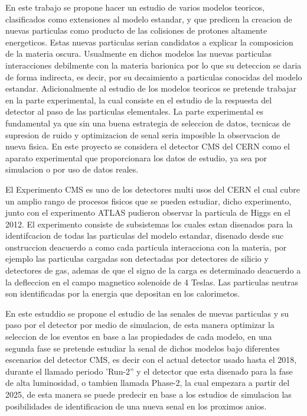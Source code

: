 En este trabajo se propone hacer un estudio de varios modelos teoricos, clasificados como extensiones al modelo estandar, y que predicen la creacion de nuevas particulas como producto de las colisiones de protones altamente energeticos. Estas nuevas particulas serian candidatos a explicar la composicion de la materia oscura.  Usualmente en dichos modelos las nuevas particulas interacciones debilmente con la materia barionica por lo que su deteccion se daria de forma indirecta, es decir, por su decaimiento a particulas conocidas del modelo estandar.  Adicionalmente al estudio de los modelos teoricos se pretende trabajar en la parte experimental, la cual consiste en el estudio de la respuesta del detector al paso de las particulas elementales.  La parte experimental es fundamental ya que sin una buena estrategia de seleccion de datos, tecnicas de supresion de ruido y optimizacion de senal seria imposible la observacion de nueva fisica. En este proyecto se considera el detector CMS del CERN como el aparato experimental que proporcionara los datos de estudio, ya sea por simulacion o por uso de datos reales.  

El Experimento CMS es uno de los detectores multi usos del CERN el cual cubre un amplio rango de procesos fisicos que se pueden estudiar, dicho experimento, junto con el experimento ATLAS pudieron observar la particula de Higgs en el 2012.  El experimento consiste de subsistemas los cuales estan disenados para la identifcacion de todas las particulas del modelo estandar, disenado desde suc onstruccion deacuerdo a como cada particula interacciona con la materia, por ejemplo las particulas cargadas son detectadas por detectores de silicio y detectores de gas, ademas de que el signo de la carga es determinado deacuerdo a la defleccion en el campo magnetico solenoide de 4 Teslas.  Las particulas neutras son identificadas por la energia que depositan en los calorimetos.   

En este estuddio se propone el estudio de las senales de nuevas particulas y su paso por el detector por medio de simulacion, de esta manera optimizar la seleccion de los eventos en base a las propiedades de cada modelo, en una segunda fase se pretende estudiar la senal de dichos modelos bajo diferentes escenarios del detector CMS, es decir con el actual detector usado hasta el 2018, durante el llamado periodo 'Run-2'' y el detector que esta disenado para la fase de alta luminosidad, o tambien llamada Phase-2, la cual empezara  a partir del 2025, de esta manera se puede predecir en base a los estudios de simulacion las posibilidades de identificacion de una nueva senal en los proximos anios. 

